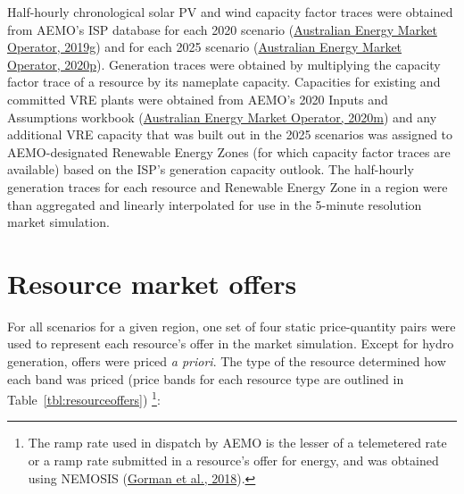 \documentclass[12pt,a4paper,]{report}
\begin{document}
Half-hourly chronological solar PV and wind capacity factor traces were
obtained from AEMO's ISP database for each 2020 scenario
(\protect\hyperlink{ref-australianenergymarketoperator2020DraftISP2019}{Australian
Energy Market Operator, 2019g}) and for each 2025 scenario
(\protect\hyperlink{ref-australianenergymarketoperator2020ISPSolar2020}{Australian
Energy Market Operator, 2020p}). Generation traces were obtained by
multiplying the capacity factor trace of a resource by its nameplate
capacity. Capacities for existing and committed VRE plants were obtained
from AEMO's 2020 Inputs and Assumptions workbook
(\protect\hyperlink{ref-australianenergymarketoperator2020InputsAssumptions2020}{Australian
Energy Market Operator, 2020m}) and any additional VRE capacity that was
built out in the 2025 scenarios was assigned to AEMO-designated
Renewable Energy Zones (for which capacity factor traces are available)
based on the ISP's generation capacity outlook. The half-hourly
generation traces for each resource and Renewable Energy Zone in a
region were than aggregated and linearly interpolated for use in the
5-minute resolution market simulation.

\hypertarget{resource-market-offers}{%
\section{Resource market offers}\label{resource-market-offers}}

For all scenarios for a given region, one set of four static
price-quantity pairs were used to represent each resource's offer in the
market simulation. Except for hydro generation, offers were priced
\emph{a priori}. The type of the resource determined how each band was
priced (price bands for each resource type are outlined in
Table~\ref{tbl:resourceoffers}) \footnote{The ramp rate used in dispatch
  by AEMO is the lesser of a telemetered rate or a ramp rate submitted
  in a resource's offer for energy, and was obtained using NEMOSIS
  (\protect\hyperlink{ref-gormanNEMOSISNEMOpen2018}{Gorman et al.,
  2018}).}:
\end{document}
